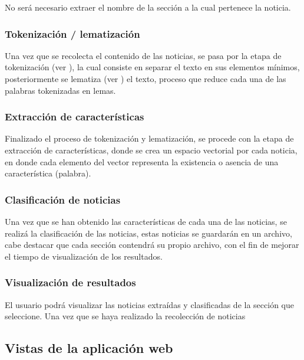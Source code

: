 No será necesario extraer el nombre de la sección a la cual pertenece la noticia.\\

\subsubsection{Tokenización / lematización}
Una vez que se recolecta el contenido de las noticias, se pasa por la etapa de tokenización (ver ), la cual consiste en separar el texto en sus elementos mínimos, posteriormente se lematiza (ver ) el texto, proceso que reduce cada una de las palabras tokenizadas en lemas.


\subsubsection{Extracción de características}
Finalizado el proceso de tokenización y lematización, se procede con la etapa de extracción de características, donde se crea un espacio vectorial por cada noticia, en donde cada elemento del vector representa la existencia o asencia de una característica (palabra).

\subsubsection{Clasificación de noticias}
Una vez que se han obtenido las características de cada una de las noticias, se realizá la clasificación de las noticias, estas noticias se guardarán en un archivo, cabe destacar que cada sección contendrá su propio archivo, con el fin de mejorar el tiempo de visualización de los resultados.

\subsubsection{Visualización de resultados}
El usuario podrá visualizar las noticias extraídas y clasificadas de la sección que seleccione.
Una vez que se haya realizado la recolección de noticias

\subsection{Vistas de la aplicación web}

